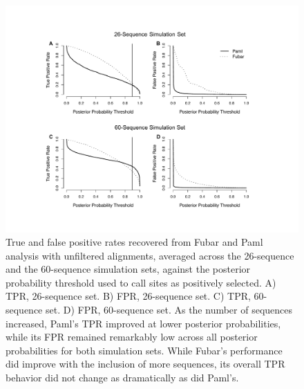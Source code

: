 \documentclass[10pt]{article}
\begin{document}
\begin{figure}[H]
\label{tprfpr}
\centerline{\includegraphics[width=7in]{Figures/tprfpr.pdf}}
\caption{True and false positive rates recovered from Fubar and Paml analysis with unfiltered alignments, averaged across the 26-sequence and the 60-sequence simulation sets, against the posterior probability threshold used to call sites as positively selected. A) TPR, 26-sequence set. B) FPR, 26-sequence set. C) TPR, 60-sequence set. D) FPR, 60-sequence set.  As the number of sequences increased, Paml's TPR improved at lower posterior probabilities, while its FPR remained remarkably low across all posterior probabilities for both simulation sets. While Fubar's performance did improve with the inclusion of more sequences, its overall TPR behavior did not change as dramatically as did Paml's.}
\end{figure}
\end{document}
